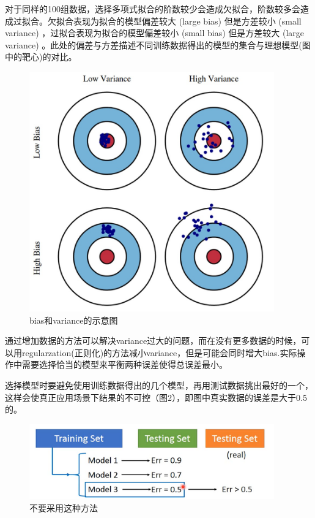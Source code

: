 \documentclass[UTF8,a4paper]{article}
\begin{document}
对于同样的100组数据，选择多项式拟合的阶数较少会造成欠拟合，阶数较多会造成过拟合。欠拟合表现为拟合的模型偏差较大 (large bias) 但是方差较小 (small variance) ，过拟合表现为拟合的模型偏差较小 (small bias) 但是方差较大 (large variance) 。此处的偏差与方差描述不同训练数据得出的模型的集合与理想模型(图中的靶心)的对比。
\begin{figure}[ht]
\centering
\includegraphics[width=300pt]{bias-variance.png}
\caption{bias和variance的示意图}
\label{bias-variance}
\end{figure}

通过增加数据的方法可以解决variance过大的问题，而在没有更多数据的时候，可以用regularzation(正则化)的方法减小variance，但是可能会同时增大bias.实际操作中需要选择恰当的模型来平衡两种误差使得总误差最小。

选择模型时要避免使用训练数据得出的几个模型，再用测试数据挑出最好的一个，这样会使真正应用场景下结果的不可控（图2），即图中真实数据的误差是大于0.5的。

\newpage

\begin{figure}[ht]
\centering
\includegraphics[width=300pt]{notdo.png}
\caption{不要采用这种方法}
\label{notdo}
\end{figure}
\end{document}
